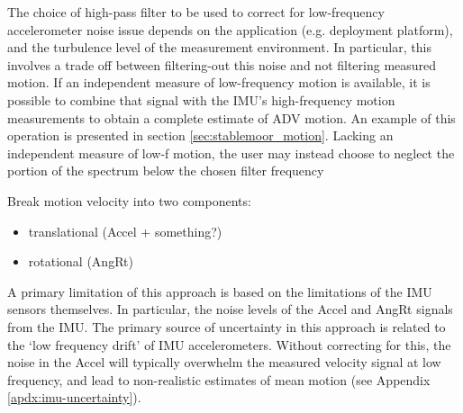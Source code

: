 \documentclass[twocol]{ametsoc}
\begin{document}
The choice of high-pass filter to be used to correct for low-frequency accelerometer noise issue depends on the application (e.g. deployment platform), and the turbulence level of the measurement environment. In particular, this involves a trade off between filtering-out this noise and not filtering measured motion. If an independent measure of low-frequency motion is available, it is possible to combine that signal with the IMU's high-frequency motion measurements to obtain a complete estimate of ADV motion. An example of this operation is presented in section \ref{sec:stablemoor_motion}. Lacking an independent measure of low-f motion, the user may instead choose to neglect the portion of the spectrum below the chosen filter frequency 

Break motion velocity into two components:
\begin{itemize}
\item translational (Accel + something?)
\item rotational  (AngRt)
\end{itemize}

A primary limitation of this approach is based on the limitations of the IMU sensors themselves. In particular, the noise levels of the Accel and AngRt signals from the IMU. The primary source of uncertainty in this approach is related to the `low frequency drift' of IMU accelerometers. Without correcting for this, the noise in the Accel will typically overwhelm the measured velocity signal at low frequency, and lead to non-realistic estimates of mean motion (see Appendix \ref{apdx:imu-uncertainty}).
\end{document}
